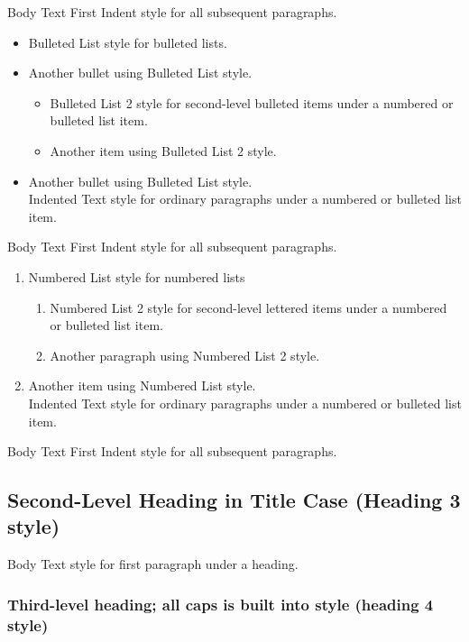 Body Text First Indent style for all subsequent paragraphs.
\begin{itemize}
    \item Bulleted List style for bulleted lists.
    \item Another bullet using Bulleted List style.
    \begin{itemize}
        \item Bulleted List 2 style for second-level bulleted items under a numbered or bulleted list item.
        \item Another item using Bulleted List 2 style.
    \end{itemize}
    \item Another bullet using Bulleted List style.\\
    Indented Text style for ordinary paragraphs under a numbered or bulleted list item.
\end{itemize}

\noindent Body Text First Indent style for all subsequent paragraphs.

\begin{enumerate}
    \item Numbered List style for numbered lists
    \begin{enumerate}
        \item Numbered List 2 style for second-level lettered items under a numbered or bulleted list item.
        \item Another paragraph using Numbered List 2 style.
    \end{enumerate}
    \item Another item using Numbered List style.\\
    Indented Text style for ordinary paragraphs under a numbered or bulleted list item.
\end{enumerate}

\noindent Body Text First Indent style for all subsequent paragraphs.

\newpage
\subsection{Second-Level Heading in Title Case (Heading 3 style)}

\indent Body Text style for first paragraph under a heading.

\subsubsection{Third-level heading; all caps is built into style (heading 4 style)}

